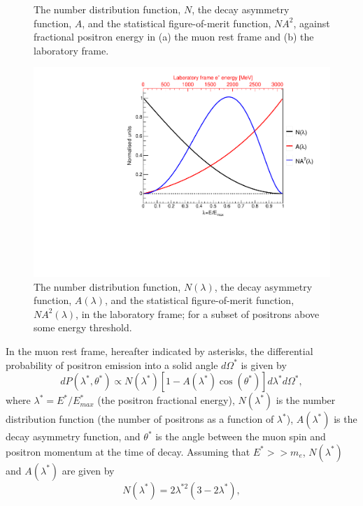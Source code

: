 \begin{figure}[b!]
\centering{}
 \hfill
{}
\caption{The number distribution function, $N$, the decay asymmetry function, $A$, and the statistical figure-of-merit function, $NA^{2}$, against fractional positron energy in (a) the muon rest frame and (b) the laboratory frame.}
\end{figure}    
%
%
\begin{figure}[t!]
\centering{}
\includegraphics[trim={0 0 0 0},clip,width=.69\textwidth]{Images/Chapter2/Asymmetry_wa_labFrame_eCut.pdf}
\caption{The number distribution function, $N(\lambda)$, the decay asymmetry function, $A(\lambda)$, and the statistical figure-of-merit function, $NA^{2}(\lambda)$, in the laboratory frame; for a subset of positrons above some energy threshold.}
\label{fig:Asymmetry_wa}
\end{figure}  
%
In the muon rest frame, hereafter indicated by asterisks, the differential probability of positron emission into a solid angle $d\Omega^{*}$ is given by 
%
\begin{equation}
  dP(\lambda^{*}, \theta^{*}) \propto N(\lambda^{*})[1-A(\lambda^{*})\cos(\theta^{*})]d\lambda^{*} d\Omega^{*},
  \label{eqn:DiffDecay}
\end{equation}
%
where $\lambda^{*}=E^{*}/E_{max}^{*}$ (the positron fractional energy), $N(\lambda^{*})$ is the number distribution function (the number of positrons as a function of $\lambda^{*}$), $A(\lambda^{*})$ is the decay asymmetry function, and $\theta^{*}$ is the angle between the muon spin and positron momentum at the time of decay. Assuming that $E^{*}>>m_{e}$, $N(\lambda^{*})$ and $A(\lambda^{*})$ are given by
%
\begin{equation}
  N(\lambda^{*}) = 2\lambda^{*2}(3-2\lambda^{*}),
  \label{eqn:N_restFrame}
\end{equation}
